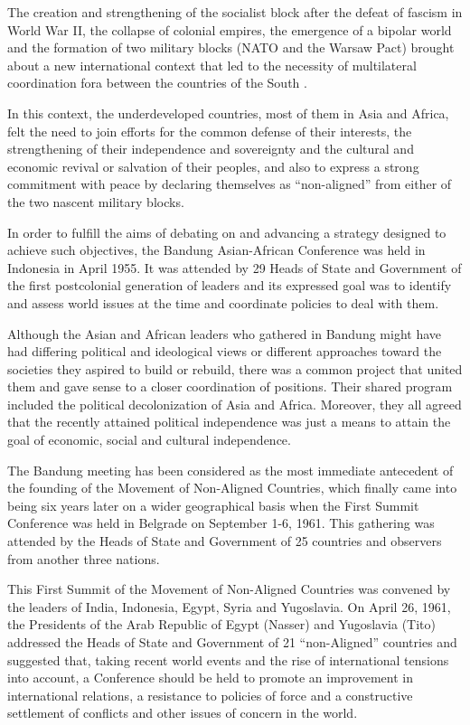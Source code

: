 \documentclass[
  openany]{book}
\begin{document}
The creation and strengthening of the socialist block after the defeat of fascism in World War II, the collapse of colonial empires, the emergence of a bipolar world and the formation of two military blocks (NATO and the Warsaw Pact) brought about a new international context that led to the necessity of multilateral coordination fora between the countries of the South .

In this context, the underdeveloped countries, most of them in Asia and Africa, felt the need to join efforts for the common defense of their interests, the strengthening of their independence and sovereignty and the cultural and economic revival or salvation of their peoples, and also to express a strong commitment with peace by declaring themselves as ``non-aligned'' from either of the two nascent military blocks.

In order to fulfill the aims of debating on and advancing a strategy designed to achieve such objectives, the Bandung Asian-African Conference was held in Indonesia in April 1955. It was attended by 29 Heads of State and Government of the first postcolonial generation of leaders and its expressed goal was to identify and assess world issues at the time and coordinate policies to deal with them.

Although the Asian and African leaders who gathered in Bandung might have had differing political and ideological views or different approaches toward the societies they aspired to build or rebuild, there was a common project that united them and gave sense to a closer coordination of positions. Their shared program included the political decolonization of Asia and Africa. Moreover, they all agreed that the recently attained political independence was just a means to attain the goal of economic, social and cultural independence.

The Bandung meeting has been considered as the most immediate antecedent of the founding of the Movement of Non-Aligned Countries, which finally came into being six years later on a wider geographical basis when the First Summit Conference was held in Belgrade on September 1-6, 1961. This gathering was attended by the Heads of State and Government of 25 countries and observers from another three nations.

This First Summit of the Movement of Non-Aligned Countries was convened by the leaders of India, Indonesia, Egypt, Syria and Yugoslavia. On April 26, 1961, the Presidents of the Arab Republic of Egypt (Nasser) and Yugoslavia (Tito) addressed the Heads of State and Government of 21 ``non-Aligned'' countries and suggested that, taking recent world events and the rise of international tensions into account, a Conference should be held to promote an improvement in international relations, a resistance to policies of force and a constructive settlement of conflicts and other issues of concern in the world.
\end{document}
